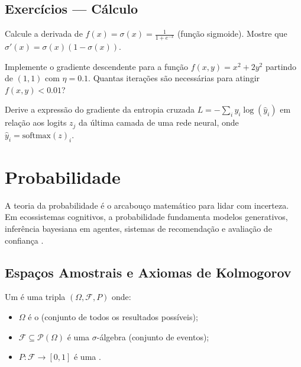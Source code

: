 \subsection{Exercícios — Cálculo}

\begin{exercicio}
    Calcule a derivada de $f(x) = \sigma(x) = \frac{1}{1 + e^{-x}}$
    (função sigmoide). Mostre que $\sigma'(x) = \sigma(x)(1 - \sigma(x))$.
\end{exercicio}

\begin{exercicio}
    Implemente o gradiente descendente para a função
    $f(x, y) = x^2 + 2y^2$ partindo de $(1, 1)$ com $\eta = 0.1$.
    Quantas iterações são necessárias para atingir $f(x, y) < 0.01$?
\end{exercicio}

\begin{exercicio}
    Derive a expressão do gradiente da entropia cruzada
    $L = -\sum_i y_i \log(\hat{y}_i)$ em relação aos logits $z_j$ da última
    camada de uma rede neural, onde $\hat{y}_i = \text{softmax}(z)_i$.
\end{exercicio}

\section{Probabilidade}
\label{sec:probabilidade}
\nivelintermediario

A teoria da probabilidade é o arcabouço matemático para lidar com
incerteza. Em ecossistemas cognitivos, a probabilidade fundamenta modelos
generativos, inferência bayesiana em agentes, sistemas de recomendação e
avaliação de confiança \cite{wasserman2004all, hastie2009elements,
russell2020inteligencia}.

\subsection{Espaços Amostrais e Axiomas de Kolmogorov}

\begin{definicao}
    Um  é uma tripla $(\Omega, \mathcal{F},
    P)$ onde:
    \begin{itemize}
        \item $\Omega$ é o  (conjunto de todos os
              resultados possíveis);
        \item $\mathcal{F} \subseteq \mathcal{P}(\Omega)$ é uma
              $\sigma$-álgebra (conjunto de eventos);
        \item $P: \mathcal{F} \to [0,1]$ é uma .
    \end{itemize}
\end{definicao}

